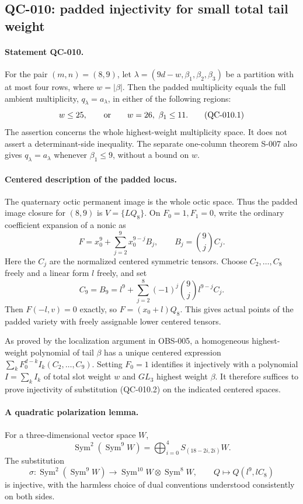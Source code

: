 \subsection{QC-010: padded injectivity for small total tail weight}

\paragraph{Statement QC-010.}
For the pair $(m,n)=(8,9)$, let
$\lambda=(9d-w,\beta_1,\beta_2,\beta_3)$ be a partition with at
most four rows, where $w=|\beta|$.
Then the padded multiplicity equals the full ambient multiplicity,
$q_\lambda=a_\lambda$, in either of the following regions:
\[
  w\leq25,\qquad\hbox{or}\qquad w=26,\ \beta_1\leq11.
  \tag{QC-010.1}
\]
The assertion concerns the whole highest-weight multiplicity space.
It does not assert a determinant-side inequality. The separate
one-column theorem S-007 also gives $q_\lambda=a_\lambda$ whenever
$\beta_1\leq9$, without a bound on $w$.

\paragraph{Centered description of the padded locus.}
The quaternary octic permanent image is the whole octic space.
Thus the padded image closure for $(8,9)$ is
$V=\{LQ_8\}$. On $F_0=1,F_1=0$, write the ordinary coefficient
expansion of a nonic as
\[
 F=x_0^9+\sum_{j=2}^9x_0^{9-j}B_j,\qquad
 B_j=\binom9j C_j.
\]
Here the $C_j$ are the normalized centered symmetric tensors.
Choose $C_2,\ldots,C_8$ freely and a linear form $l$ freely, and set
\[
 C_9=B_9=l^9+
       \sum_{j=2}^8(-1)^j\binom9j l^{9-j}C_j.
 \tag{QC-010.2}
\]
Then $F(-l,v)=0$ exactly, so $F=(x_0+l)Q_8$.
This gives actual points of the padded variety with freely
assignable lower centered tensors.

As proved by the localization argument in OBS-005, a homogeneous
highest-weight polynomial of tail $\beta$ has a unique centered
expression
$\sum_k F_0^{d-k}I_k(C_2,\ldots,C_9)$.
Setting $F_0=1$ identifies it injectively with a polynomial
$I=\sum_k I_k$ of total slot weight $w$ and $GL_3$ highest
weight $\beta$. It therefore suffices to prove injectivity
of substitution (QC-010.2) on the indicated centered spaces.

\paragraph{A quadratic polarization lemma.}
For a three-dimensional vector space $W$,
\[
 \operatorname{Sym}^2(\operatorname{Sym}^9W)
    =\bigoplus_{i=0}^4 S_{(18-2i,2i)}W.
 \tag{QC-010.3}
\]
The substitution
\[
 \sigma:\operatorname{Sym}^2(\operatorname{Sym}^9W)
       \longrightarrow
       \operatorname{Sym}^{10}W\otimes\operatorname{Sym}^{8}W,
 \qquad
 Q\longmapsto Q(l^9,lC_8)
 \tag{QC-010.4}
\]
is injective, with the harmless choice of dual conventions
understood consistently on both sides.

